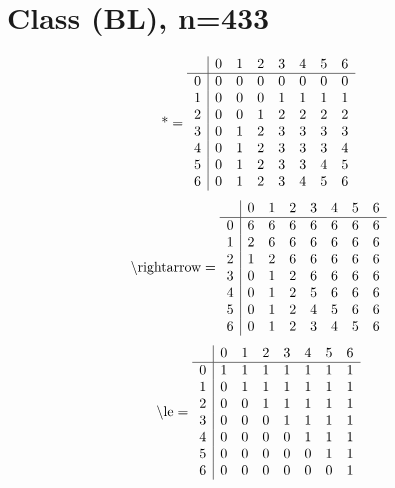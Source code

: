 \documentclass[11pt]{article}
\begin{document}
\section{Class (BL), n=433}
\[\text{*} = 
\begin{array}{r | r r r r r r r}
 & 0 & 1 & 2 & 3 & 4 & 5 & 6 \\ \hline
0 & 0 & 0 & 0 & 0 & 0 & 0 & 0 \\
1 & 0 & 0 & 0 & 1 & 1 & 1 & 1 \\
2 & 0 & 0 & 1 & 2 & 2 & 2 & 2 \\
3 & 0 & 1 & 2 & 3 & 3 & 3 & 3 \\
4 & 0 & 1 & 2 & 3 & 3 & 3 & 4 \\
5 & 0 & 1 & 2 & 3 & 3 & 4 & 5 \\
6 & 0 & 1 & 2 & 3 & 4 & 5 & 6 \\
\end{array}
\]
\[\text{\textbackslash rightarrow} = 
\begin{array}{r | r r r r r r r}
 & 0 & 1 & 2 & 3 & 4 & 5 & 6 \\ \hline
0 & 6 & 6 & 6 & 6 & 6 & 6 & 6 \\
1 & 2 & 6 & 6 & 6 & 6 & 6 & 6 \\
2 & 1 & 2 & 6 & 6 & 6 & 6 & 6 \\
3 & 0 & 1 & 2 & 6 & 6 & 6 & 6 \\
4 & 0 & 1 & 2 & 5 & 6 & 6 & 6 \\
5 & 0 & 1 & 2 & 4 & 5 & 6 & 6 \\
6 & 0 & 1 & 2 & 3 & 4 & 5 & 6 \\
\end{array}
\]
\[\text{\textbackslash le} = 
\begin{array}{r | r r r r r r r}
 & 0 & 1 & 2 & 3 & 4 & 5 & 6 \\ \hline
0 & 1 & 1 & 1 & 1 & 1 & 1 & 1 \\
1 & 0 & 1 & 1 & 1 & 1 & 1 & 1 \\
2 & 0 & 0 & 1 & 1 & 1 & 1 & 1 \\
3 & 0 & 0 & 0 & 1 & 1 & 1 & 1 \\
4 & 0 & 0 & 0 & 0 & 1 & 1 & 1 \\
5 & 0 & 0 & 0 & 0 & 0 & 1 & 1 \\
6 & 0 & 0 & 0 & 0 & 0 & 0 & 1 \\
\end{array}
\]
\end{document}
